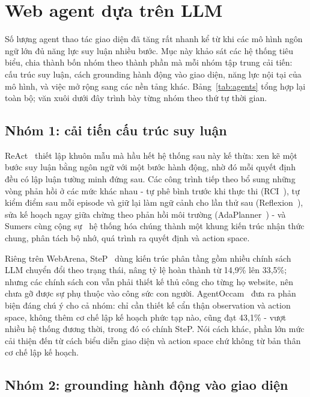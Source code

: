 \section{Web agent dựa trên LLM}
\label{sec:rel-llm-agents}

Số lượng agent thao tác giao diện đã tăng rất nhanh kể từ khi các mô hình
ngôn ngữ lớn đủ năng lực suy luận nhiều bước. Mục này khảo sát các hệ thống
tiêu biểu, chia thành bốn nhóm theo thành phần mà mỗi nhóm tập trung cải
tiến: cấu trúc suy luận, cách grounding hành động vào giao diện, năng lực
nội tại của mô hình, và việc mở rộng sang các nền tảng khác.
Bảng~\ref{tab:agents} tổng hợp lại toàn bộ; văn xuôi dưới đây trình bày từng
nhóm theo thứ tự thời gian.

\subsection{Nhóm 1: cải tiến cấu trúc suy luận}

ReAct~\cite{yao2023react} thiết lập khuôn mẫu mà hầu hết hệ thống sau này kế
thừa: xen kẽ một bước suy luận bằng ngôn ngữ với một bước hành động, nhờ đó mỗi
quyết định đều có lập luận tường minh đứng sau. Các công trình tiếp theo bổ
sung những vòng phản hồi ở các mức khác nhau - tự phê bình trước khi thực thi
(RCI~\cite{kim2023rci}), tự kiểm điểm sau mỗi episode và giữ lại làm ngữ cảnh
cho lần thử sau (Reflexion~\cite{shinn2023reflexion}), sửa kế hoạch ngay giữa
chừng theo phản hồi môi trường (AdaPlanner~\cite{sun2023adaplanner}) - và Sumers
cùng cộng sự~\cite{sumers2024cognitive} hệ thống hóa chúng thành một khung kiến
trúc nhận thức chung, phân tách bộ nhớ, quá trình ra quyết định và action space.

Riêng trên WebArena, SteP~\cite{sodhi2024step} dùng kiến trúc phân tầng gồm
nhiều chính sách LLM chuyển đổi theo trạng thái, nâng tỷ lệ hoàn thành từ
14{,}9\% lên 33{,}5\%; nhưng các chính sách con vẫn phải thiết kế thủ công cho
từng họ website, nên chưa gỡ được sự phụ thuộc vào công sức con người.
AgentOccam~\cite{yang2024agentoccam} đưa ra phản biện đáng chú ý cho cả nhóm:
chỉ cần thiết kế cẩn thận observation và action space, không thêm cơ chế
lập kế hoạch phức tạp nào, cũng đạt 43{,}1\% - vượt nhiều hệ thống đương thời,
trong đó có chính SteP. Nói cách khác, phần lớn mức cải thiện đến từ cách biểu
diễn giao diện và action space chứ không từ bản thân cơ chế lập kế
hoạch.

\subsection{Nhóm 2: grounding hành động vào giao diện}

